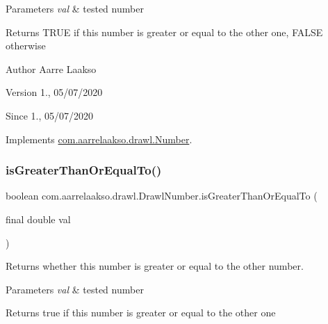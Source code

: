 \begin{DoxyParams}{Parameters}
{\em val} & tested number \\
\hline
\end{DoxyParams}
\begin{DoxyReturn}{Returns}
{\ttfamily T\+R\+UE} if this number is greater or equal to the other one, {\ttfamily F\+A\+L\+SE} otherwise 
\end{DoxyReturn}
\begin{DoxyAuthor}{Author}
Aarre Laakso 
\end{DoxyAuthor}
\begin{DoxyVersion}{Version}
1., 05/07/2020 
\end{DoxyVersion}
\begin{DoxySince}{Since}
1., 05/07/2020 
\end{DoxySince}


Implements \hyperlink{interfacecom_1_1aarrelaakso_1_1drawl_1_1_number_a9c3df12a860251807827d670994b89a4}{com.\+aarrelaakso.\+drawl.\+Number}.

\mbox{\label{classcom_1_1aarrelaakso_1_1drawl_1_1_drawl_number_a372a1c39c58497d16d02476d7ecd8299}} 
\subsubsection{\texorpdfstring{is\+Greater\+Than\+Or\+Equal\+To()}{isGreaterThanOrEqualTo()}\hspace{0.1cm}{\footnotesize\ttfamily [2/2]}}
{\footnotesize\ttfamily boolean com.\+aarrelaakso.\+drawl.\+Drawl\+Number.\+is\+Greater\+Than\+Or\+Equal\+To (\begin{DoxyParamCaption}\item[{final double}]{val }\end{DoxyParamCaption})}



Returns whether this number is greater or equal to the other number. 


\begin{DoxyParams}{Parameters}
{\em val} & tested number \\
\hline
\end{DoxyParams}
\begin{DoxyReturn}{Returns}
true if this number is greater or equal to the other one 
\end{DoxyReturn}


